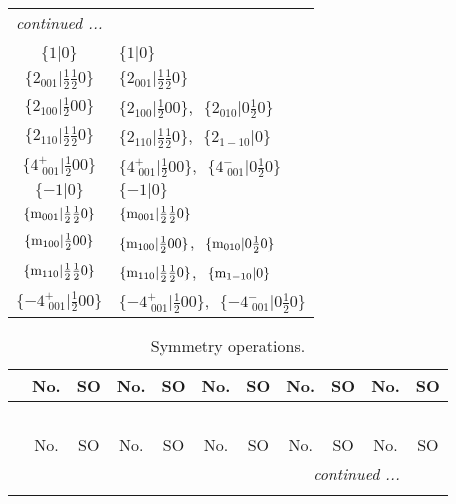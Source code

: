 \documentclass[fleqn,10pt,landscape]{article}
\begin{document}
\begin{itemize}
\begin{center}
\begin{longtable}{c|l}
 \hline \hline
\multicolumn{1}{r}{\footnotesize\it continued ...} \\ \endfoot

 \hline \hline
\multicolumn{1}{r}{} \\ \endlastfoot

$\{1|0\}$ & $\{1|0\}$ \\ \hline
$\{2{}_{001}|\frac{1}{2} \frac{1}{2} 0\}$ & $\{2{}_{001}|\frac{1}{2} \frac{1}{2} 0\}$ \\ \hline
$\{2{}_{100}|\frac{1}{2} 0 0\}$ & $\{2{}_{100}|\frac{1}{2} 0 0\}$,\,\, $\{2{}_{010}|0 \frac{1}{2} 0\}$ \\ \hline
$\{2{}_{110}|\frac{1}{2} \frac{1}{2} 0\}$ & $\{2{}_{110}|\frac{1}{2} \frac{1}{2} 0\}$,\,\, $\{2{}_{1-10}|0\}$ \\ \hline
$\{4^{+}_{\,\,001}|\frac{1}{2} 0 0\}$ & $\{4^{+}_{\,\,001}|\frac{1}{2} 0 0\}$,\,\, $\{4^{-}_{\,\,001}|0 \frac{1}{2} 0\}$ \\ \hline
$\{-1|0\}$ & $\{-1|0\}$ \\ \hline
$\{{\rm m}_{001}|\frac{1}{2} \frac{1}{2} 0\}$ & $\{{\rm m}_{001}|\frac{1}{2} \frac{1}{2} 0\}$ \\ \hline
$\{{\rm m}_{100}|\frac{1}{2} 0 0\}$ & $\{{\rm m}_{100}|\frac{1}{2} 0 0\}$,\,\, $\{{\rm m}_{010}|0 \frac{1}{2} 0\}$ \\ \hline
$\{{\rm m}_{110}|\frac{1}{2} \frac{1}{2} 0\}$ & $\{{\rm m}_{110}|\frac{1}{2} \frac{1}{2} 0\}$,\,\, $\{{\rm m}_{1-10}|0\}$ \\ \hline
$\{-4^{+}_{\,\,001}|\frac{1}{2} 0 0\}$ & $\{-4^{+}_{\,\,001}|\frac{1}{2} 0 0\}$,\,\, $\{-4^{-}_{\,\,001}|0 \frac{1}{2} 0\}$ \\
\end{longtable}
\end{center}
\begin{center}
\renewcommand{\arraystretch}{1.3}
\begin{longtable}{c|cc|cc|cc|cc|cc}
\caption{Symmetry operations.}
 \\
 \hline \hline
 & No. & SO & No. & SO & No. & SO & No. & SO & No. & SO \\ \hline \endfirsthead

\multicolumn{10}{l}{\tablename\ \thetable{}} \\
 \hline \hline
 & No. & SO & No. & SO & No. & SO & No. & SO & No. & SO \\ \hline \endhead

 \hline \hline
\multicolumn{10}{r}{\footnotesize\it continued ...} \\ \endfoot


\end{longtable}
\end{center}
\end{itemize}
\end{document}
